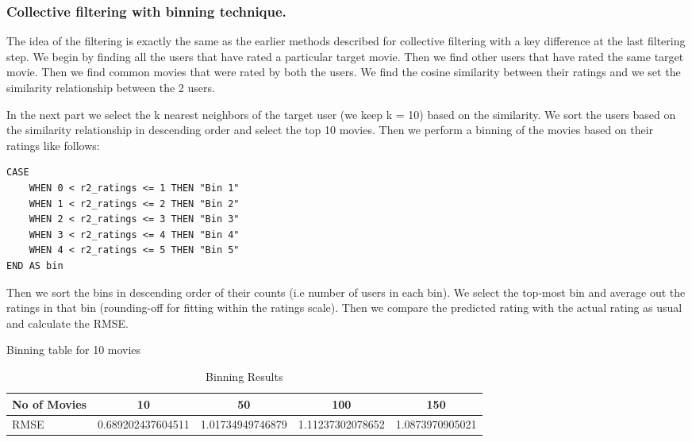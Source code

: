 \documentclass{article}
\begin{document}
\subsubsection{Collective filtering with binning technique.}\label{sec:bintechnique}

The idea of the filtering is exactly the same as the earlier methods described for collective filtering with a key difference at the last filtering step. We begin by finding all the users that have rated a particular target movie. Then we find other users that have rated the same target movie. Then we find common movies that were rated by both the users. We find the cosine similarity between their ratings and we set the similarity relationship between the 2 users.

In the next part we select the k nearest neighbors of the target user (we keep k = 10) based on the similarity. We sort the users based on the similarity relationship in descending order and select the top 10 movies. Then we perform a binning of the movies based on their ratings like follows:

\begin{verbatim}
CASE 
    WHEN 0 < r2_ratings <= 1 THEN "Bin 1"
    WHEN 1 < r2_ratings <= 2 THEN "Bin 2"
    WHEN 2 < r2_ratings <= 3 THEN "Bin 3"
    WHEN 3 < r2_ratings <= 4 THEN "Bin 4"
    WHEN 4 < r2_ratings <= 5 THEN "Bin 5"
END AS bin
\end{verbatim}

Then we sort the bins in descending order of their counts (i.e number of users in each bin). We select the top-most bin and average out the ratings in that bin (rounding-off for fitting within the ratings scale).
Then we compare the predicted rating with the actual rating as usual and calculate the RMSE.

\begin{table}[h] %
    \centering
    \caption{Binning table for 10 movies} %
    \label{tab:binning-table-movies} %
\end{table}

\begin{table}[h] %
    \centering
    \caption{Binning Results} %
    \label{tab:binning-results} %
    \begin{tabular}{lS[table-auto-round]S[table-auto-round]S[table-auto-round]S[table-auto-round]}
    \hline
        {No of Movies} & {10} & {50} & {100} & {150} \\ \hline
        RMSE & 0.689202437604511 & 1.01734949746879 & 1.11237302078652 & 1.0873970905021 \\ 
    \hline
    \end{tabular}
\end{table}
\end{document}
